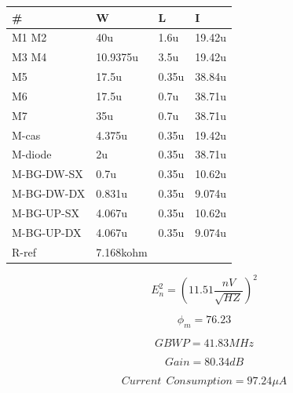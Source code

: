 \centering
\label{my-label}
\begin{tabular}{|l|l|l|l|}
\hline
\#      & W         & L     & I      \\ \hline
M1 M2   & 40u       & 1.6u  & 19.42u \\ \hline
M3 M4   & 10.9375u  & 3.5u  & 19.42u \\ \hline
M5      & 17.5u     & 0.35u & 38.84u \\ \hline
M6      & 17.5u     & 0.7u  & 38.71u \\ \hline
M7      & 35u       & 0.7u  & 38.71u \\ \hline
M-cas    & 4.375u    & 0.35u & 19.42u \\ \hline
M-diode  & 2u        & 0.35u & 38.71u \\ \hline
M-BG-DW-SX & 0.7u      & 0.35u & 10.62u \\ \hline
M-BG-DW-DX & 0.831u    & 0.35u & 9.074u \\ \hline
M-BG-UP-SX & 4.067u    & 0.35u & 10.62u \\ \hline
M-BG-UP-DX & 4.067u    & 0.35u      & 9.074u \\ \hline
R-ref      & 7.168kohm &       &        \\ \hline
\end{tabular}


\begin{equation}
  E_n^2=( 11.51 \frac {nV} { \sqrt{HZ}})^2
\end{equation}

\begin{equation}
  \phi_m=76.23
\end{equation}

\begin{equation}
  GBWP=41.83MHz
\end{equation}

\begin{equation}
  Gain=80.34dB
\end{equation}

\begin{equation}
  Current \ \ Consumption = 97.24 \mu A
\end{equation}



